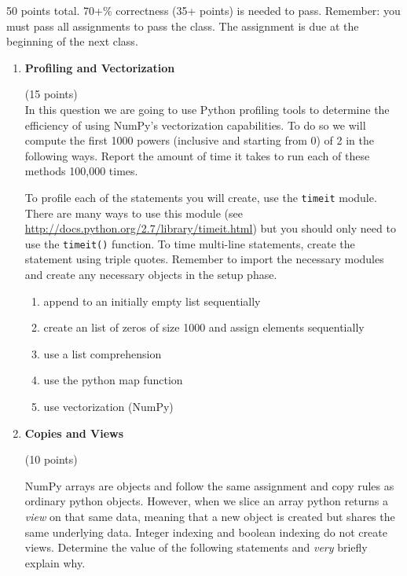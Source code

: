 \documentclass{article}
\newcounter{points}
\newcommand\setpoints[1]{\addtocounter{points}{#1}(#1 points)}
\begin{document}
\pagestyle{fancy}

50  points total.  70+\% correctness (35+ points) is needed to pass. Remember: you must pass all assignments to pass the class.  The assignment is due at the beginning of the next class.

\begin{enumerate}
\item \textbf{Profiling and Vectorization} \setpoints{15} \\
In this question we are going to use Python profiling tools to determine the efficiency of using NumPy's vectorization capabilities. To do so we will compute the first 1000 powers (inclusive and starting from 0) of 2 in the following ways. Report the amount of time it takes to run each of these methods 100,000 times.
\vspace{.1in}

To profile each of the statements you will create, use the \texttt{timeit} module. There are many ways to use this module (see
\url{ http://docs.python.org/2.7/library/timeit.html}) but you should only need to use the \texttt{timeit()} function. To time multi-line statements, create the statement using triple quotes. Remember to import the necessary modules and create any necessary objects in the setup phase.

\begin{enumerate}
\item append  to an initially empty list sequentially 
\item create an list of zeros of size 1000 and assign elements sequentially
\item use a list comprehension
\item use the python map function
\item use vectorization (NumPy)
\end{enumerate}

\item \textbf{Copies and Views} \setpoints{10}

NumPy arrays are objects and follow the same assignment and copy rules as ordinary python objects. However, when we slice an array python returns a \textit{view} on that same data, meaning that a new object is created but shares the same underlying data. Integer indexing and boolean indexing do not create views. Determine the value of the following statements and \textit{very }briefly explain why. 
\begin{enumerate}



\end{enumerate}
\end{enumerate}
\end{document}
